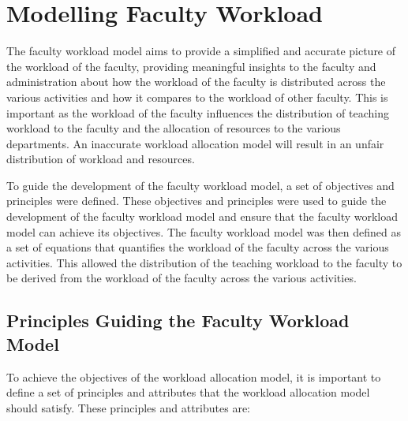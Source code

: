 \section{Modelling Faculty Workload}

The faculty workload model aims to provide a simplified and accurate picture of the workload of the faculty, providing meaningful insights to the faculty and administration about how the workload of the faculty is distributed across the various activities and how it compares to the workload of other faculty. This is important as the workload of the faculty influences the distribution of teaching workload to the faculty and the allocation of resources to the various departments. An inaccurate workload allocation model will result in an unfair distribution of workload and resources.

To guide the development of the faculty workload model, a set of objectives and principles were defined. These objectives and principles were used to guide the development of the faculty workload model and ensure that the faculty workload model can achieve its objectives. The faculty workload model was then defined as a set of equations that quantifies the workload of the faculty across the various activities. This allowed the distribution of the teaching workload to the faculty to be derived from the workload of the faculty across the various activities.

\subsection{Principles Guiding the Faculty Workload Model}
\label{sec:principles_guiding_workload_allocation_model}

To achieve the objectives of the workload allocation model, it is important to define a set of principles and attributes that the workload allocation model should satisfy. These principles and attributes are:

